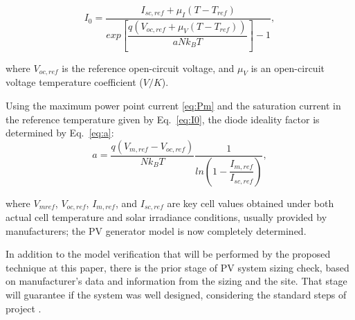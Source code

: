 \documentclass[journal]{IEEEtran}
\begin{document}
\begin{equation}
\label{eq:I0}
I_{0} = \dfrac{I_{sc,ref} + \mu_{I}(T - T_{ref})}{exp \left[ \dfrac{q(V_{oc,ref} + \mu_{V} (T - T_{ref}))}{aNk_{B}T}    \right] -1},
\end{equation}

\noindent where $ V_{oc,ref} $ is the reference open-circuit voltage, and $ \mu_{V} $ is an open-circuit voltage temperature coefficient ($ V/K $).

Using the maximum power point current \eqref{eq:Pm} and the saturation current in the reference temperature given by Eq.~\ref{eq:I0}, the diode ideality factor is determined by Eq.~\ref{eq:a}:
\begin{equation}
\label{eq:a}
a = \dfrac{q(V_{m,ref}-V_{oc,ref})}{Nk_{B}T} \dfrac{1}{ln \left( 1 - \dfrac{I_{m,ref}}{I_{sc,ref}}  \right) },
\end{equation}

\noindent where $V_{mref}$, $V_{oc,ref}$, $I_{m,ref}$, and $I_{sc,ref}$ are key cell values obtained under both actual cell temperature and solar irradiance conditions, usually provided by manufacturers; the PV generator model is now completely determined.
%
%
%
%
%
%

In addition to the model verification that will be performed by the proposed technique at this paper, there is the prior stage of PV system sizing check, based on manufacturer's data and information from the sizing and the site. That stage will guarantee if the system was well designed, considering the standard steps of project \cite{Pinho}.
\end{document}
